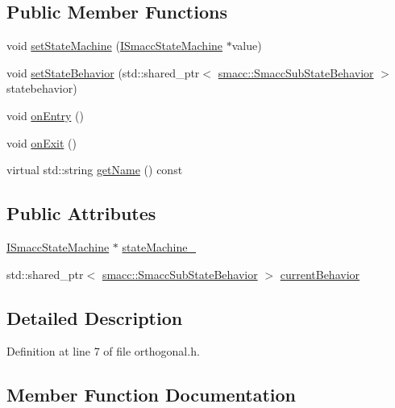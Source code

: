 \subsection*{Public Member Functions}
\begin{DoxyCompactItemize}
\item 
void \hyperlink{classsmacc_1_1Orthogonal_a05f65c01344a6c8593f7f88c0ca19654}{set\+State\+Machine} (\hyperlink{classsmacc_1_1ISmaccStateMachine}{I\+Smacc\+State\+Machine} $\ast$value)
\item 
void \hyperlink{classsmacc_1_1Orthogonal_a0476ba0e6575824893947918567ebbaa}{set\+State\+Behavior} (std\+::shared\+\_\+ptr$<$ \hyperlink{classsmacc_1_1SmaccSubStateBehavior}{smacc\+::\+Smacc\+Sub\+State\+Behavior} $>$ statebehavior)
\item 
void \hyperlink{classsmacc_1_1Orthogonal_a77888104f276bdbd177d69cf23f11a56}{on\+Entry} ()
\item 
void \hyperlink{classsmacc_1_1Orthogonal_a71c0df3d9e8327e65286e1ce0a3a7043}{on\+Exit} ()
\item 
virtual std\+::string \hyperlink{classsmacc_1_1Orthogonal_ae1ad57a2fda4d7f2ecf708c342fc1bb9}{get\+Name} () const 
\end{DoxyCompactItemize}
\subsection*{Public Attributes}
\begin{DoxyCompactItemize}
\item 
\hyperlink{classsmacc_1_1ISmaccStateMachine}{I\+Smacc\+State\+Machine} $\ast$ \hyperlink{classsmacc_1_1Orthogonal_acea2058ac94667e46fc60ed3d4f524f7}{state\+Machine\+\_\+}
\item 
std\+::shared\+\_\+ptr$<$ \hyperlink{classsmacc_1_1SmaccSubStateBehavior}{smacc\+::\+Smacc\+Sub\+State\+Behavior} $>$ \hyperlink{classsmacc_1_1Orthogonal_aac82a4b0f756c942ff4947dc1cd6586b}{current\+Behavior}
\end{DoxyCompactItemize}


\subsection{Detailed Description}


Definition at line 7 of file orthogonal.\+h.



\subsection{Member Function Documentation}
